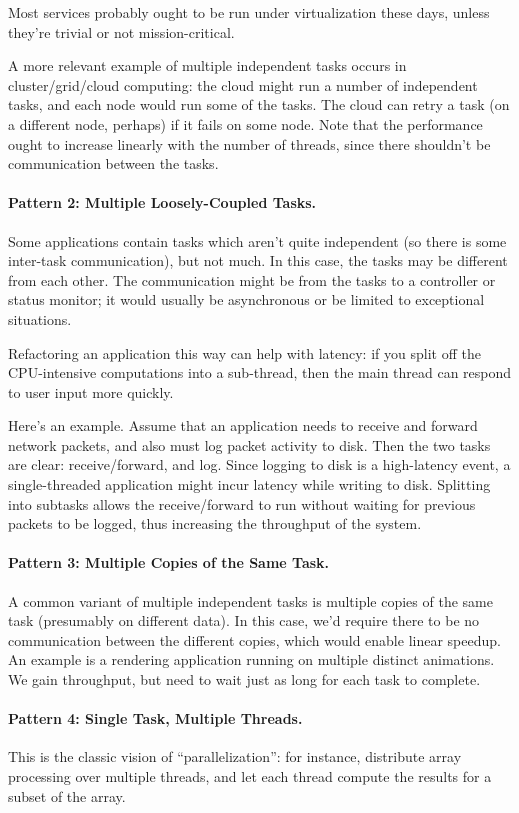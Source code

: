 \documentclass[a4paper]{report}
\begin{document}
Most services probably ought to be run under virtualization these
days, unless they're trivial or not mission-critical.

A more relevant example of multiple independent tasks occurs in
cluster/grid/cloud computing: the cloud might run a number of
independent tasks, and each node would run some of the tasks. The
cloud can retry a task (on a different node, perhaps) if it fails on
some node. Note that the performance ought to increase linearly with
the number of threads, since there shouldn't be communication between
the tasks.

\paragraph{Pattern 2: Multiple Loosely-Coupled Tasks.} Some applications contain
tasks which aren't quite independent (so there is some inter-task
communication), but not much.  In this case, the tasks may be
different from each other. The communication might be from the tasks
to a controller or status monitor; it would usually be asynchronous or
be limited to exceptional situations.

Refactoring an application this way can help with latency: if you 
split off the CPU-intensive computations into a sub-thread, then
the main thread can respond to user input more quickly.

Here's an example. Assume that an application needs to receive and
forward network packets, and also must log packet activity to disk.
Then the two tasks are clear: receive/forward, and log. Since logging
to disk is a high-latency event, a single-threaded application might
incur latency while writing to disk. Splitting into subtasks allows
the receive/forward to run without waiting for previous packets to be
logged, thus increasing the throughput of the system.

\paragraph{Pattern 3: Multiple Copies of the Same Task.} A common variant of
multiple independent tasks is multiple copies of the same task
(presumably on different data). In this case, we'd require there to be
no communication between the different copies, which would enable
linear speedup. An example is a rendering application running on
multiple distinct animations. We gain throughput, but need to wait
just as long for each task to complete.

\paragraph{Pattern 4: Single Task, Multiple Threads.} This is the classic
vision of ``parallelization'': for instance, distribute array
processing over multiple threads, and let each thread compute the
results for a subset of the array.
\end{document}
